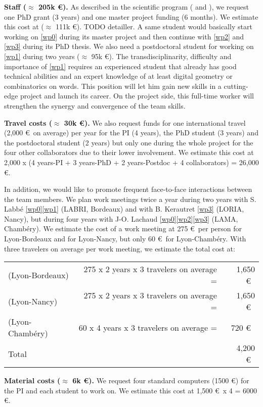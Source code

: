 \textbf{Staff ($\approx$ 205k \euro).} As described in the scientific program ( and ),
we request one PhD grant (3 years) and one master project funding (6 months).
We estimate this cost at  ($\approx$ 111k \euro). TODO detailler.
A same student would basically start working on \ref{wp0} during its master project and then
continue with \ref{wp2} and \ref{wp3} during its PhD thesis.
We also need a postdoctoral student for working on \ref{wp1} during two years ($\approx$ 95k \euro). 
The transdisciplinarity, difficulty and importance of \ref{wp1} requires an experienced student
that already has good technical abilities and an expert knowledge of at least digital geometry
or combinatorics on words. This position will let him gain new skills in a cutting-edge project
and launch its career. On the project side, this full-time worker will strengthen the synergy and
convergence of the team skills. 

\textbf{Travel costs ($\approx$ 30k \euro).}
We also request funds for one international travel (2,000 \euro~on average)
per year for the PI (4 years), the PhD student (3 years) and the postdoctoral student (2 years)
but only one during the whole project for the four other collaborators due to their lower involvement.
We estimate this cost at 2,000 x (4 years-PI + 3 years-PhD + 2 years-Postdoc + 4 collaborators) = 26,000 \euro. 

In addition, we would like to promote frequent face-to-face interactions between the team members.
We plan work meetings twice a year during two years with
S. Labb\'{e} \ref{wp0}\ref{wp1} (LABRI, Bordeaux) and
with B. Kerautret \ref{wp3} (LORIA, Nancy),
but during four years
with J-O. Lachaud \ref{wp0}\ref{wp2}\ref{wp3} (LAMA, Chamb\'{e}ry).
We estimate the cost of a work meeting at 275 \euro~per person
for Lyon-Bordeaux and for Lyon-Nancy,
but only 60 \euro~for Lyon-Chamb\'{e}ry.
With three travelers on average per work meeting, we estimate the total cost at:

\begin{tabular}{lrr}
  (Lyon-Bordeaux) & 275 x 2 years x 3 travelers on average =& 1,650 \euro~\\ 
  (Lyon-Nancy) & 275 x 2 years x 3 travelers on average =& 1,650 \euro~\\
  (Lyon-Chamb\'{e}ry) & 60 x 4 years x 3 travelers on average =& 720 \euro~\\
  Total & ~ & 4,200 \euro~\\
\end{tabular}

\textbf{Material costs ($\approx$ 6k \euro).}
We request four standard computers (1500 \euro) for the PI and each student to work on.
We estimate this cost at 1,500 \euro~x 4 = 6000 \euro. 
